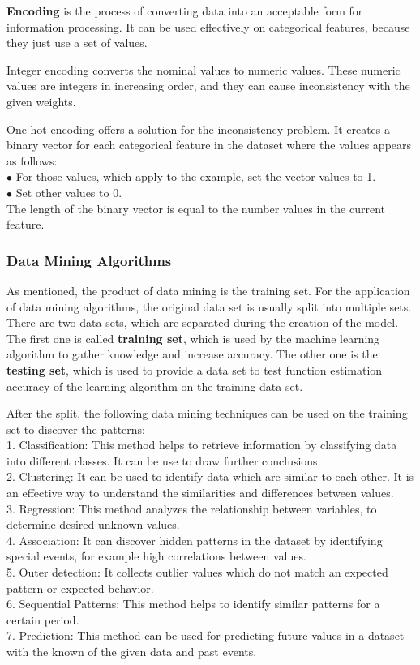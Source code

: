 \textbf{Encoding} is the process of converting data into an acceptable form for information processing. It can be used effectively on categorical features, because they just use a set of values. \smallskip

Integer encoding converts the nominal values to numeric values. These numeric values are integers in increasing order, and they can cause inconsistency with the given weights.\smallskip

One-hot encoding offers a solution for the inconsistency problem. It creates a binary vector for each categorical feature in the dataset where the values appears as follows:\\
$\bullet$ For those values, which apply to the example, set the vector values to 1.\\
$\bullet$ Set other values to 0.\\
The length of the binary vector is equal to the number values in the current feature.


\subsubsection{Data Mining Algorithms}

As mentioned, the product of data mining is the training set. For the application of data mining algorithms, the original data set is usually split into multiple sets. There are two data sets, which are separated during the creation of the model. The first one is called \textbf{training set}, which is used by the machine learning algorithm to gather knowledge and increase accuracy. The other one is the \textbf{testing set}, which is used to provide a data set to test function estimation accuracy of the learning algorithm on the training data set.\medskip

After the split, the following data mining techniques \cite{pujari2001data} can be used on the training set to discover the patterns:\\
1. Classification: This method helps to retrieve information by classifying data into different classes. It can be use to draw further conclusions.\\
2. Clustering: It can be used to identify data which are similar to each other. It is an effective way to understand the similarities and differences between values.\\
3. Regression:  This method analyzes the relationship between variables, to determine desired unknown values.\\
4. Association: It can discover hidden patterns in the dataset by identifying special events, for example high correlations between values.\\
5. Outer detection: It collects outlier values which do not match an expected pattern or expected behavior. \\
6. Sequential Patterns: This method helps to identify similar patterns for a certain period. \\
7. Prediction: This method can be used for predicting future values in a dataset with the known of the given data and past events.  \medskip

